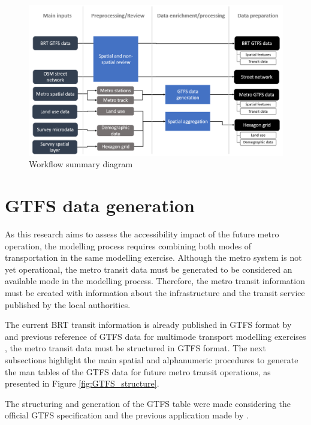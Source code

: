 \documentclass[12pt, a4paper]{report}
\begin{document}
\begin{figure}[H]
    \centering
    \includegraphics[width=13cm]{Images/Workflow_summary.png}
    \caption{Workflow summary diagram}
    \label{fig:Workflow_Summary}
\end{figure}

\section{GTFS data generation}

As this research aims to assess the accessibility impact of the future metro operation, the modelling process requires combining both modes of transportation in the same modelling exercise. Although the metro system is not yet operational, the metro transit data must be generated to be considered an available mode in the modelling process. Therefore, the metro transit information must be created with information about the infrastructure and the transit service published by the local authorities.

The current BRT transit information is already published in GTFS format by \citep{alcaldiadebogotad.c.EstacionesPrimeraLinea2022,alcaldiadebogotad.c.TrazadoPrimeraLinea2022} and previous reference of GTFS data for multimode transport modelling exercises \citep{pereiraIntroductionUrbanAccessibility2023a}, the metro transit data must be structured in GTFS format. The next subsections highlight the main spatial and alphanumeric procedures to generate the man tables of the GTFS data for future metro transit operations, as presented in Figure \ref{fig:GTFS_structure}.

The structuring and generation of the GTFS table were made considering the official GTFS specification \citep{mobiltydataGeneralTransitFeed2023} and the previous application made by \cite{pereiraIntroductionUrbanAccessibility2023a}.
\end{document}
